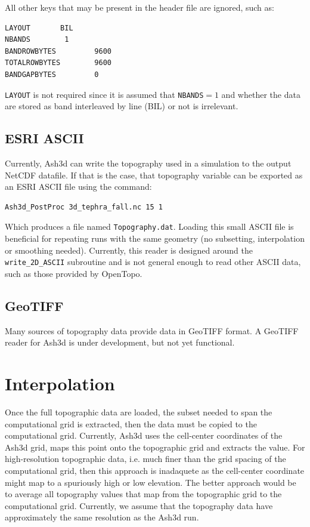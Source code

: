 All other keys that may be present in the header file are ignored, such as:
\small
\begin{verbatim}
LAYOUT       BIL
NBANDS        1
BANDROWBYTES         9600
TOTALROWBYTES        9600
BANDGAPBYTES         0
\end{verbatim}
\normalsize
\texttt{LAYOUT} is not required since it
is assumed that \texttt{NBANDS}$=1$ and whether the data are stored as band
interleaved by line (BIL) or not is irrelevant.

\subsection{ESRI ASCII}
Currently, Ash3d can write the topography used in a simulation to the output NetCDF
datafile. If that is the case, that topography variable can be exported as an
ESRI ASCII file using the command:
\small
\begin{verbatim}
Ash3d_PostProc 3d_tephra_fall.nc 15 1
\end{verbatim}
\normalsize
Which produces a file named \texttt{Topography.dat}.
Loading this small ASCII file is beneficial for repeating runs with the same geometry
(no subsetting, interpolation or smoothing needed). Currently, this reader is
designed around the \texttt{write\_2D\_ASCII} subroutine and is not general enough to 
read other ASCII data, such as those provided by OpenTopo.
\subsection{GeoTIFF}
Many sources of topography data provide data in GeoTIFF format. A GeoTIFF reader for
Ash3d is under development, but not yet functional.

\section{Interpolation}\label{ChapAppendTopo_Sec_Interp}
Once the full topographic data are loaded, the subset needed to span the computational grid is
extracted, then the data must be copied to the computational grid. Currently, Ash3d uses
the cell-center coordinates of the Ash3d grid, maps this point onto the topographic
grid and extracts the value. For high-resolution topographic data, i.e. much finer than the
grid spacing of the computational grid, then this approach is inadaquete as the cell-center
coordinate might map to a spuriously high or low elevation. The better approach would be
to average all topography values that map from the topographic grid to the computational
grid. Currently, we assume that the topography data have approximately the same resolution
as the Ash3d run.

